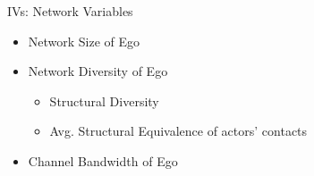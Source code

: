 \begin{frame}{{\color{violet}IVs: Network Variables}}

  \begin{itemize}
    \item Network Size of Ego
    \item Network {\color{sred}Diversity} of Ego
    \begin{itemize}
      \item Structural Diversity
      \item Avg. Structural Equivalence of actors' contacts
    \end{itemize}
    \item Channel {\color{turq}Bandwidth} of Ego
  \end{itemize}

    

\end{frame}
